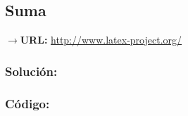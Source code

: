 \documentclass[12pt]{article}
\begin{document}
          \subsection{Suma}
            $\rightarrow$\textbf{URL: }\url{http://www.latex-project.org/}
            
            \subsubsection{Solución:}
            
            \subsubsection{Código:}
                \inputminted{cpp}{Code/suma.cpp}
        
        
        
        
    
    
\end{document}
